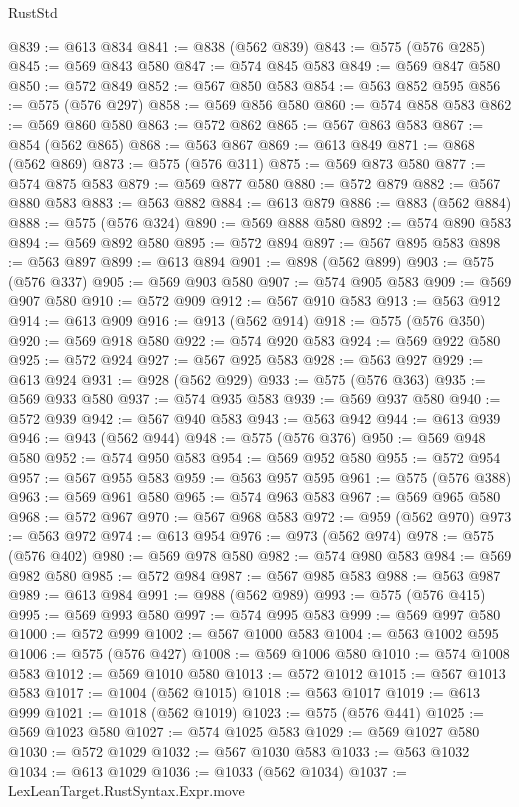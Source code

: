 \begin{lexlean}{RustStd}
\begin{coremodule}
@839 := @613 @834
@841 := @838 (@562 @839)
@843 := @575 (@576 @285)
@845 := @569 @843 @580
@847 := @574 @845 @583
@849 := @569 @847 @580
@850 := @572 @849
@852 := @567 @850 @583
@854 := @563 @852 @595
@856 := @575 (@576 @297)
@858 := @569 @856 @580
@860 := @574 @858 @583
@862 := @569 @860 @580
@863 := @572 @862
@865 := @567 @863 @583
@867 := @854 (@562 @865)
@868 := @563 @867
@869 := @613 @849
@871 := @868 (@562 @869)
@873 := @575 (@576 @311)
@875 := @569 @873 @580
@877 := @574 @875 @583
@879 := @569 @877 @580
@880 := @572 @879
@882 := @567 @880 @583
@883 := @563 @882
@884 := @613 @879
@886 := @883 (@562 @884)
@888 := @575 (@576 @324)
@890 := @569 @888 @580
@892 := @574 @890 @583
@894 := @569 @892 @580
@895 := @572 @894
@897 := @567 @895 @583
@898 := @563 @897
@899 := @613 @894
@901 := @898 (@562 @899)
@903 := @575 (@576 @337)
@905 := @569 @903 @580
@907 := @574 @905 @583
@909 := @569 @907 @580
@910 := @572 @909
@912 := @567 @910 @583
@913 := @563 @912
@914 := @613 @909
@916 := @913 (@562 @914)
@918 := @575 (@576 @350)
@920 := @569 @918 @580
@922 := @574 @920 @583
@924 := @569 @922 @580
@925 := @572 @924
@927 := @567 @925 @583
@928 := @563 @927
@929 := @613 @924
@931 := @928 (@562 @929)
@933 := @575 (@576 @363)
@935 := @569 @933 @580
@937 := @574 @935 @583
@939 := @569 @937 @580
@940 := @572 @939
@942 := @567 @940 @583
@943 := @563 @942
@944 := @613 @939
@946 := @943 (@562 @944)
@948 := @575 (@576 @376)
@950 := @569 @948 @580
@952 := @574 @950 @583
@954 := @569 @952 @580
@955 := @572 @954
@957 := @567 @955 @583
@959 := @563 @957 @595
@961 := @575 (@576 @388)
@963 := @569 @961 @580
@965 := @574 @963 @583
@967 := @569 @965 @580
@968 := @572 @967
@970 := @567 @968 @583
@972 := @959 (@562 @970)
@973 := @563 @972
@974 := @613 @954
@976 := @973 (@562 @974)
@978 := @575 (@576 @402)
@980 := @569 @978 @580
@982 := @574 @980 @583
@984 := @569 @982 @580
@985 := @572 @984
@987 := @567 @985 @583
@988 := @563 @987
@989 := @613 @984
@991 := @988 (@562 @989)
@993 := @575 (@576 @415)
@995 := @569 @993 @580
@997 := @574 @995 @583
@999 := @569 @997 @580
@1000 := @572 @999
@1002 := @567 @1000 @583
@1004 := @563 @1002 @595
@1006 := @575 (@576 @427)
@1008 := @569 @1006 @580
@1010 := @574 @1008 @583
@1012 := @569 @1010 @580
@1013 := @572 @1012
@1015 := @567 @1013 @583
@1017 := @1004 (@562 @1015)
@1018 := @563 @1017
@1019 := @613 @999
@1021 := @1018 (@562 @1019)
@1023 := @575 (@576 @441)
@1025 := @569 @1023 @580
@1027 := @574 @1025 @583
@1029 := @569 @1027 @580
@1030 := @572 @1029
@1032 := @567 @1030 @583
@1033 := @563 @1032
@1034 := @613 @1029
@1036 := @1033 (@562 @1034)
@1037 := LexLeanTarget.RustSyntax.Expr.move

\end{coremodule}
\end{lexlean}
